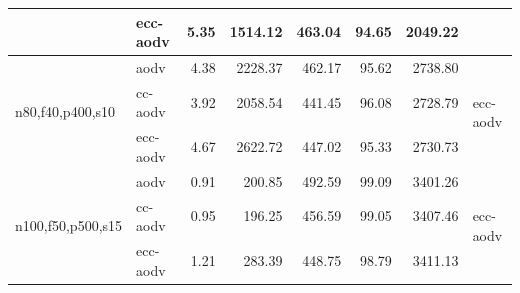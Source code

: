 \documentclass[11pt,a4paper]{article}
\begin{document}
\begin{table}[h]
\begin{tabular}{l l r r r r r l}
 & ecc-aodv & \cellcolor{lightgreen}5.35  & \cellcolor{lightgreen}1514.12 & \cellcolor{lightgreen}463.04 & \cellcolor{lightgreen}94.65 & 2049.22                       & \\
\midrule
\multirow{3}{*}{n80,f40,p400,s10}
 & aodv     & 4.38                        & 2228.37                       & 462.17                       & 95.62                       & 2738.80                       & \multirow{3}{*}{ecc-aodv} \\
 & cc-aodv  & 3.92                        & 2058.54                       & \cellcolor{lightgreen}441.45 & 96.08                       & \cellcolor{lightgreen}2728.79 & \\
 & ecc-aodv & \cellcolor{lightgreen}4.67  & \cellcolor{lightgreen}2622.72 & 447.02                       & \cellcolor{lightgreen}95.33 & 2730.73                       & \\
\midrule
\multirow{3}{*}{n100,f50,p500,s15}
 & aodv     & 0.91                        & 200.85                        & 492.59                       & 99.09                       & \cellcolor{lightgreen}3401.26 & \multirow{3}{*}{ecc-aodv} \\
 & cc-aodv  & 0.95                        & 196.25                        & 456.59                       & 99.05                       & 3407.46                       & \\
 & ecc-aodv & \cellcolor{lightgreen}1.21  & \cellcolor{lightgreen}283.39  & \cellcolor{lightgreen}448.75 & \cellcolor{lightgreen}98.79 & 3411.13                       & \\
\bottomrule
\end{tabular}
\end{table}
\end{document}
